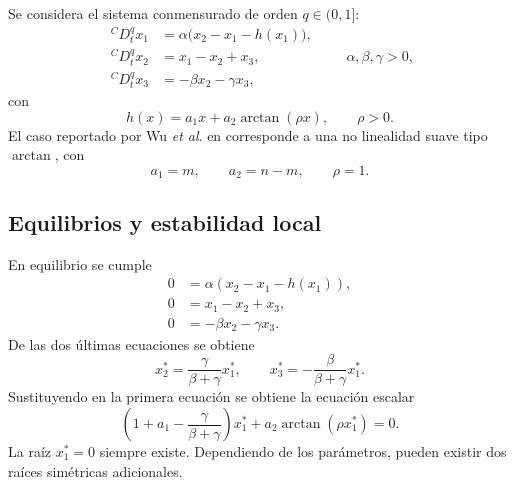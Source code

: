 \documentclass[journal]{IEEEtran}
\begin{document}
Se considera el sistema conmensurado de orden $q\in(0,1]$:
\begin{equation}
\label{eq:arctan_system}
\begin{aligned}
{}^{C}D_t^q x_1 &= \alpha\bigl(x_2-x_1-h(x_1)\bigr),\\
{}^{C}D_t^q x_2 &= x_1-x_2+x_3,\\
{}^{C}D_t^q x_3 &= -\beta x_2-\gamma x_3,
\end{aligned}
\qquad \alpha,\beta,\gamma>0,
\end{equation}
con
\begin{equation}
\label{eq:h_arctan}
h(x)=a_1x+a_2\arctan(\rho x),
\qquad \rho>0.
\end{equation}
El caso reportado por Wu \emph{et al}. en \cite{Wu2023ArctanChua} corresponde a una no linealidad suave tipo $\arctan$, con
\begin{equation}
\label{eq:wu_mapping}
a_1=m,
\qquad
a_2=n-m,
\qquad
\rho=1.
\end{equation}

\subsection{Equilibrios y estabilidad local}

En equilibrio se cumple
\begin{equation}
\label{eq:equilibria_conditions_arctan}
\begin{aligned}
0&=\alpha(x_2-x_1-h(x_1)),\\
0&=x_1-x_2+x_3,\\
0&=-\beta x_2-\gamma x_3.
\end{aligned}
\end{equation}
De las dos últimas ecuaciones se obtiene
\begin{equation}
\label{eq:yz_equilibrio_arctan}
x_2^*=\frac{\gamma}{\beta+\gamma}x_1^*,
\qquad
x_3^*=-\frac{\beta}{\beta+\gamma}x_1^*.
\end{equation}
Sustituyendo en la primera ecuación se obtiene la ecuación escalar
\begin{equation}
\label{eq:equilibrio_escalar_arctan}
\left(1+a_1-\frac{\gamma}{\beta+\gamma}\right)x_1^*+a_2\arctan(\rho x_1^*)=0.
\end{equation}
La raíz $x_1^*=0$ siempre existe. Dependiendo de los parámetros, pueden existir dos raíces simétricas adicionales.
\end{document}
